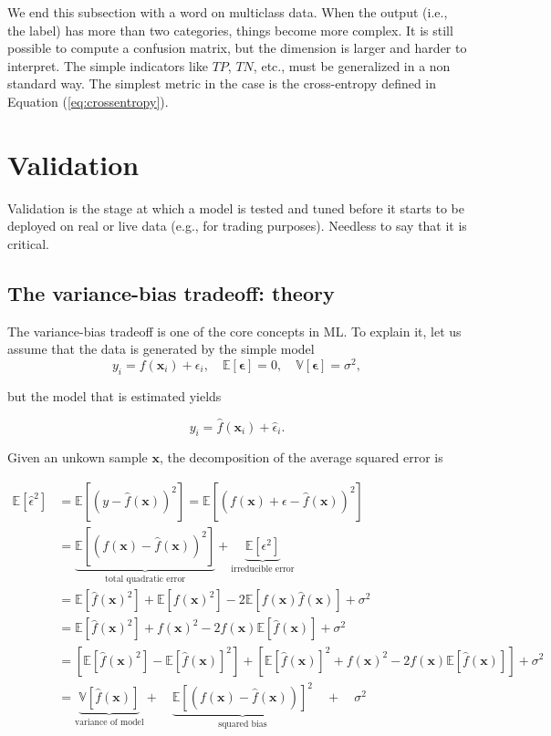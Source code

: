\documentclass[]{krantz}
\theoremstyle{definition}
\theoremstyle{definition}
\theoremstyle{definition}
\theoremstyle{remark}
\begin{document}
We end this subsection with a word on multiclass data. When the output
(i.e., the label) has more than two categories, things become more
complex. It is still possible to compute a confusion matrix, but the
dimension is larger and harder to interpret. The simple indicators like
\(TP\), \(TN\), etc., must be generalized in a non standard way. The
simplest metric in the case is the cross-entropy defined in Equation
(\eqref{eq:crossentropy}).

\hypertarget{validation}{%
\section{Validation}\label{validation}}

Validation is the stage at which a model is tested and tuned before it
starts to be deployed on real or live data (e.g., for trading purposes).
Needless to say that it is critical.

\hypertarget{the-variance-bias-tradeoff-theory}{%
\subsection{The variance-bias tradeoff:
theory}\label{the-variance-bias-tradeoff-theory}}

The variance-bias tradeoff is one of the core concepts in ML. To explain
it, let us assume that the data is generated by the simple model
\[y_i=f(\textbf{x}_i)+\epsilon_i, \quad   \mathbb{E}[\boldsymbol{\epsilon}]=0, \quad \mathbb{V}[\boldsymbol{\epsilon}]=\sigma^2,\]

but the model that is estimated yields

\[y_i=\hat{f}(\textbf{x}_i)+\hat{\epsilon}_i. \]

Given an unkown sample \(\textbf{x}\), the decomposition of the average
squared error is

\begin{align} \label{eq:biasvariance}
\mathbb{E}[\hat{\epsilon}^2]&=\mathbb{E}[(y-\hat{f}(\textbf{x}))^2]=\mathbb{E}[(f(\textbf{x})+\epsilon-\hat{f}(\textbf{x}))^2]   \\
&= \underbrace{\mathbb{E}[(f(\textbf{x})-\hat{f}(\textbf{x}))^2]}_{\text{total quadratic error}}+\underbrace{\mathbb{E}[\epsilon^2]}_{\text{irreducible error}} \nonumber \\
&= \mathbb{E}[\hat{f}(\textbf{x})^2]+\mathbb{E}[f(\textbf{x})^2]-2\mathbb{E}[f(\textbf{x})\hat{f}(\textbf{x})]+\sigma^2\nonumber\\
&=\mathbb{E}[\hat{f}(\textbf{x})^2]+f(\textbf{x})^2-2f(\textbf{x})\mathbb{E}[\hat{f}(\textbf{x})]+\sigma^2\nonumber\\
&=\left[ \mathbb{E}[\hat{f}(\textbf{x})^2]-\mathbb{E}[\hat{f}(\textbf{x})]^2\right]+\left[\mathbb{E}[\hat{f}(\textbf{x})]^2+f(\textbf{x})^2-2f(\textbf{x})\mathbb{E}[\hat{f}(\textbf{x})]\right]+\sigma^2\nonumber\\
&=\underbrace{\mathbb{V}[\hat{f}(\textbf{x})]}_{\text{variance of model}}+ \quad \underbrace{\mathbb{E}[(f(\textbf{x})-\hat{f}(\textbf{x}))]^2}_{\text{squared bias}}\quad +\quad\sigma^2 \nonumber
\end{align}
\end{document}
